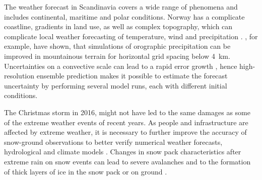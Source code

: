 The weather forecast in Scandinavia covers a wide range of phenomena and includes continental, maritime and polar conditions. Norway has a complicate coastline, gradients in land use, as well as complex topography, which can complicate local weather forecasting of temperature, wind and precipitation \citep{muller_arome-metcoop:_2017}. \citet{colle_1314_2005,garvert_1314_2005,schwartz_reproducing_2014}, for example, have shown, that simulations of orographic precipitation can be improved in mountainous terrain for horizontal grid spacing below \SI{4}{\km}. Uncertainties on a convective scale can lead to a rapid error growth \citep{lorenz_atmospheric_1969}, hence high-resolution ensemble prediction makes it possible to estimate the forecast uncertainty by performing several model runs, each with different initial conditions. %
\par\medskip
\noindent
The Christmas storm in 2016, might not have led to the same damages as some of the extreme weather events of recent years. As people and infrastructure are affected by extreme weather, it is necessary to further improve the accuracy of snow-ground observations to better verify numerical weather forecasts, hydrological and climate models \citep{joos_influence_2012}. Changes in snow pack characteristics after extreme rain on snow events can lead to severe avalanches \citep{stimberis_glide_2011} and to the formation of thick layers of ice in the snow pack or on ground \citep{putkonen_rain--snow_2003,hansen_climate_2011}.

